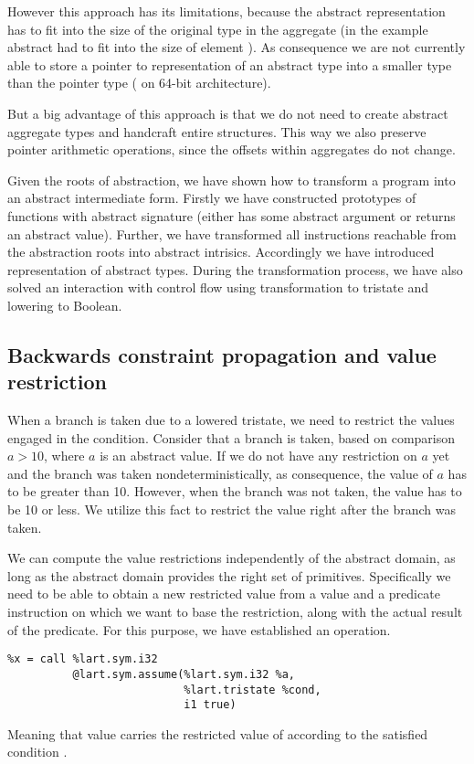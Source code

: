 However this approach has its limitations, because the abstract representation
has to fit into the size of the original type in the aggregate (in the example
abstract  had to fit into the size of element ). As consequence
we are not currently able to store a pointer to representation of an abstract type
into a smaller type than the pointer type ( on 64-bit
architecture).

But a big advantage of this approach is that we do not need to create
abstract aggregate types and handcraft entire structures. This way we also
preserve pointer arithmetic operations, since the offsets within
aggregates do not change.

\begin{summary}
Given the roots of abstraction, we have shown how to transform a program into an
abstract intermediate form. Firstly we have constructed prototypes of
functions with abstract signature (either has some abstract argument or
returns an abstract value). Further, we have transformed all instructions
reachable from the abstraction roots into abstract intrisics. Accordingly we
have introduced representation of abstract types. During the transformation
process, we have also solved an interaction with control flow using
transformation to tristate and lowering to \LLVM Boolean.
\end{summary}

\subsection{Backwards constraint propagation and value restriction}
\label{sec:bcp}
When a branch is taken due to a lowered tristate, we need to restrict the values
engaged in the condition. Consider that a branch is taken, based on comparison $a
> 10$, where $a$ is an abstract value. If we do not have any restriction on $a$
yet and the branch was taken nondeterministically, as consequence, the value of $a$
has to be greater than 10. However, when the branch was not taken,
the value has to be 10 or less. We utilize this fact to restrict the value
right after the branch was taken.

We can compute the value restrictions independently of the abstract domain, as
long as the abstract domain provides the right set of primitives. Specifically we
need to be able to obtain a new restricted value from a value and a predicate
instruction on which we want to base the restriction, along with the actual
result of the predicate. For this purpose, we have established
an  operation.
\begin{verbatim}
%x = call %lart.sym.i32
          @lart.sym.assume(%lart.sym.i32 %a,
                           %lart.tristate %cond,
                           i1 true)
\end{verbatim}
Meaning that value  carries the restricted value of 
according to the satisfied condition .

